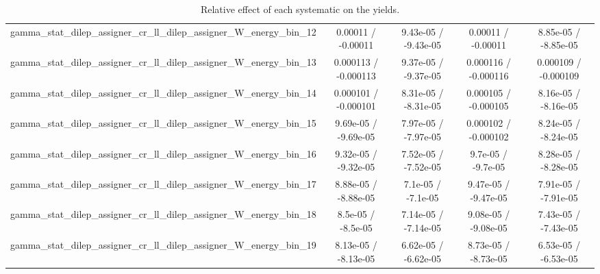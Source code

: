 \documentclass[10pt]{article}
\begin{document}
\begin{table}[htbp]
\begin{center}
\begin{tabular}{|c|c|c|c|c|}
  gamma_stat_dilep_assigner_cr_ll_dilep_assigner_W_energy_bin_12 & 0.00011 / -0.00011 & 9.43e-05 / -9.43e-05 & 0.00011 / -0.00011 & 8.85e-05 / -8.85e-05 \\ 
  gamma_stat_dilep_assigner_cr_ll_dilep_assigner_W_energy_bin_13 & 0.000113 / -0.000113 & 9.37e-05 / -9.37e-05 & 0.000116 / -0.000116 & 0.000109 / -0.000109 \\ 
  gamma_stat_dilep_assigner_cr_ll_dilep_assigner_W_energy_bin_14 & 0.000101 / -0.000101 & 8.31e-05 / -8.31e-05 & 0.000105 / -0.000105 & 8.16e-05 / -8.16e-05 \\ 
  gamma_stat_dilep_assigner_cr_ll_dilep_assigner_W_energy_bin_15 & 9.69e-05 / -9.69e-05 & 7.97e-05 / -7.97e-05 & 0.000102 / -0.000102 & 8.24e-05 / -8.24e-05 \\ 
  gamma_stat_dilep_assigner_cr_ll_dilep_assigner_W_energy_bin_16 & 9.32e-05 / -9.32e-05 & 7.52e-05 / -7.52e-05 & 9.7e-05 / -9.7e-05 & 8.28e-05 / -8.28e-05 \\ 
  gamma_stat_dilep_assigner_cr_ll_dilep_assigner_W_energy_bin_17 & 8.88e-05 / -8.88e-05 & 7.1e-05 / -7.1e-05 & 9.47e-05 / -9.47e-05 & 7.91e-05 / -7.91e-05 \\ 
  gamma_stat_dilep_assigner_cr_ll_dilep_assigner_W_energy_bin_18 & 8.5e-05 / -8.5e-05 & 7.14e-05 / -7.14e-05 & 9.08e-05 / -9.08e-05 & 7.43e-05 / -7.43e-05 \\ 
  gamma_stat_dilep_assigner_cr_ll_dilep_assigner_W_energy_bin_19 & 8.13e-05 / -8.13e-05 & 6.62e-05 / -6.62e-05 & 8.73e-05 / -8.73e-05 & 6.53e-05 / -6.53e-05 \\ 
\hline 
\end{tabular} 
\caption{Relative effect of each systematic on the yields.} 
\end{center} 
\end{table} 
\end{document}
